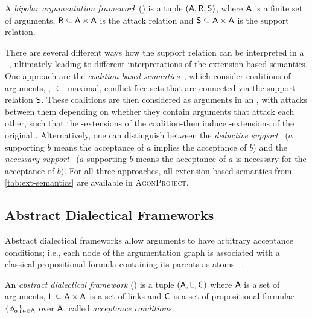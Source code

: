 \documentclass[
]{ceurart}
\newcommand{\agon}{\textsc{AgonProject}\xspace}
\begin{document}
\begin{definition}\label{def:baf}
    A \emph{bipolar argumentation framework} (\BAF) is a tuple $(\arguments,\attacks, \supports)$, where $\arguments$ is a finite set of arguments, $\attacks\subseteq \arguments\times\arguments$ is the attack relation and $\supports\subseteq \arguments\times\arguments$ is the support relation.
\end{definition}

There are several different ways how the support relation can be interpreted in a \BAF~\cite{DBLP:journals/ijar/CayrolL13,DBLP:journals/ker/CohenGGS14}, ultimately leading to different interpretations of the extension-based semantics.
One approach are the \emph{coalition-based semantics}~\cite{DBLP:journals/ijis/CayrolL10}, which consider coalitions of arguments, \ie, $\subseteq$-maximal, conflict-free sets that are connected via the support relation $\mathsf{S}$.
These coalitions are then considered as arguments in an \AF, with attacks between them depending on whether they contain arguments that attack each other, such that the \sem-extensions of the coalition-\AF then induce \sem-extensions of the original \BAF.
Alternatively, one can distinguish between the \emph{deductive support}~\cite{DBLP:conf/comma/BoellaGTV10} ($a$ supporting $b$ means the acceptance of $a$ implies the acceptance of $b$) and the \emph{necessary support}~\cite{DBLP:conf/ictai/NouiouaR10} ($a$ supporting $b$ means the acceptance of $a$ is necessary for the acceptance of $b$).
For all three approaches, all extension-based semantics from \autoref{tab:ext-semantics} are available in \agon.

\subsection{Abstract Dialectical Frameworks}

Abstract dialectical frameworks allow arguments to have arbitrary acceptance conditions; i.e., each node of the argumentation graph is associated with a classical propositional formula containing its parents as atoms~ \cite{DBLP:conf/kr/BrewkaW10,DBLP:conf/ijcai/BrewkaSEWW13}.

\begin{definition}\label{def:adf}
    An \emph{abstract dialectical framework} (\ADF) is a tuple $(\arguments,\links,\conditions)$ where $\arguments$ is a set of arguments, $\links \subseteq \arguments\times\arguments$ is a set of links and $\mathsf{C}$ is a set of propositional formulae $\{\phi_a\}_{a\in\arguments}$ over $\arguments$, called \emph{acceptance conditions}.%
\end{definition}
\end{document}
